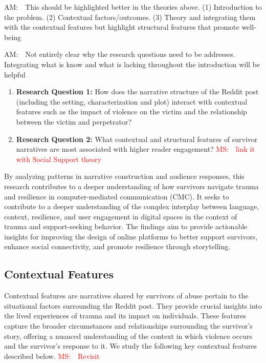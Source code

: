 \documentclass[11pt]{article}
\newcommand{\ms}[1]{\textcolor{red}{{MS:~~#1}}}
\newcommand{\am}[1]{\textcolor{red!80!black!40}{{AM:~~#1}}}
\begin{document}
\am{This should be highlighted better in the theories above. (1) Introduction to the problem. (2) Contextual factors/outcomes. (3) Theory and integrating them with the contextual features but highlight structural features that promote well-being }


\am{Not entirely clear why the research questions need to be addresses. Integrating what is know and what is lacking throughout the introduction will be helpful }

\begin{enumerate}
    \item \textbf{Research Question 1:} How does the narrative structure of the Reddit post (including the setting, characterization and plot) interact with contextual features such as the impact of violence on the victim and the relationship between the victim and perpetrator?
    \item \textbf{Research Question 2:} What contextual and structural features of survivor narratives are most associated with higher reader engagement? \ms{link it with Social Support theory}
\end{enumerate}

By analyzing patterns in narrative construction and audience responses, this research contributes to a deeper understanding of how survivors navigate trauma and resilience in computer-mediated communication (CMC). 
It seeks to contribute to a deeper understanding of the complex interplay between language, context, resilience, and user engagement in digital spaces in the context of trauma and support-seeking behavior.
The findings aim to provide actionable insights for improving the design of online platforms to better support survivors, enhance social connectivity, and promote resilience through storytelling.

\subsection{Contextual Features}

Contextual features are narratives shared by survivors of abuse pertain to the situational factors surrounding the Reddit post. 
They provide crucial insights into the lived experiences of trauma and its impact on individuals. 
These features capture the broader circumstances and relationships surrounding the survivor's story, offering a nuanced understanding of the context in which violence occurs and the survivor's response to it.
We study the following key contextual features described below.
\ms{Revisit}
\end{document}
